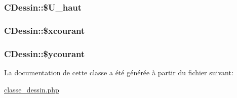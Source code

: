\hypertarget{classCDessin_o12}{
\subsubsection[\$U\_\-haut]{\setlength{\rightskip}{0pt plus 5cm}CDessin::\$U\_\-haut}}
\label{classCDessin_o12}


\hypertarget{classCDessin_o17}{
\subsubsection[\$xcourant]{\setlength{\rightskip}{0pt plus 5cm}CDessin::\$xcourant}}
\label{classCDessin_o17}


\hypertarget{classCDessin_o18}{
\subsubsection[\$ycourant]{\setlength{\rightskip}{0pt plus 5cm}CDessin::\$ycourant}}
\label{classCDessin_o18}




La documentation de cette classe a \'{e}t\'{e} g\'{e}n\'{e}r\'{e}e \`{a} partir du fichier suivant:\begin{CompactItemize}
\item 
\hyperlink{classe__dessin_8php}{classe\_\-dessin.php}\end{CompactItemize}
